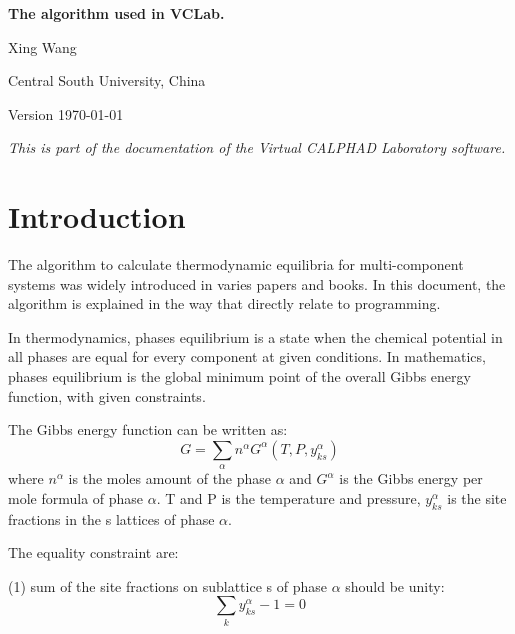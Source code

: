 \documentclass[12pt]{article}
\begin{document}
\begin{center}

{\Large \bf The algorithm used in VCLab.}

\bigskip

Xing Wang

\bigskip

Central South University, China

\bigskip

Version \today

\end{center}


\bigskip

{\em This is part of the documentation of the Virtual CALPHAD Laboratory
software.}

\newpage

\tableofcontents

\newpage


\section{Introduction}

The algorithm to calculate thermodynamic equilibria for 
multi-component systems was widely introduced in varies papers
and books. In this document, the algorithm is explained in the 
way that directly relate to programming.

In thermodynamics, phases equilibrium is a state when the chemical potential
in all phases are equal for every component at given conditions. In mathematics, phases
equilibrium is the global minimum point of the overall Gibbs energy function,
with given constraints.

The Gibbs energy function can be written as:
\begin{equation}
G = \sum_{\alpha} n^{\alpha} G^{\alpha}(T,P,y^{\alpha}_{ks}) \label{eq:gsum}
\end{equation}
where $n^{\alpha}$ is the moles amount of the phase $\alpha$ and
$G^{\alpha}$ is the Gibbs energy per mole formula of phase $\alpha$. T and P
is the temperature and pressure, $y^{\alpha}_{ks}$ is the site fractions in the
 s lattices of phase $\alpha$.

\noindent
The equality constraint are:

(1) sum of the site fractions on sublattice s of phase $\alpha$ should be unity:
\begin{equation}
\sum_k y^{\alpha}_{ks} - 1= 0
\end{equation}
\end{document}
